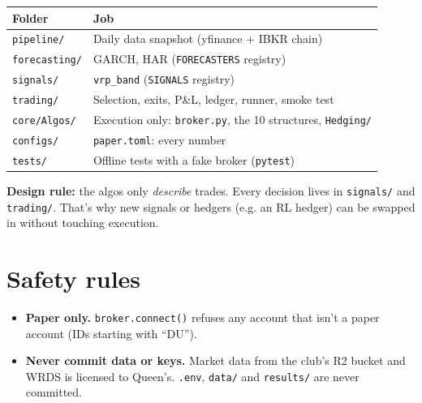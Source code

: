 \documentclass{article}
\begin{document}
\begin{center}\small
\begin{tabularx}{\linewidth}{>{\raggedright\arraybackslash}X >{\raggedright\arraybackslash}X}
\toprule
\textbf{Folder} & \textbf{Job} \\
\midrule
\texttt{pipeline/\allowbreak{}} & Daily data snapshot (yfinance + IBKR chain) \\
\texttt{forecasting/\allowbreak{}} & GARCH, HAR (\texttt{FORECASTERS} registry) \\
\texttt{signals/\allowbreak{}} & \texttt{vrp\_\allowbreak{}band} (\texttt{SIGNALS} registry) \\
\texttt{trading/\allowbreak{}} & Selection, exits, P\&L, ledger, runner, smoke test \\
\texttt{core/\allowbreak{}Algos/\allowbreak{}} & Execution only: \texttt{broker.\allowbreak{}py}, the 10 structures, \texttt{Hedging/\allowbreak{}} \\
\texttt{configs/\allowbreak{}} & \texttt{paper.\allowbreak{}toml}: every number \\
\texttt{tests/\allowbreak{}} & Offline tests with a fake broker (\texttt{pytest}) \\
\bottomrule
\end{tabularx}
\end{center}

\textbf{Design rule:} the algos only \emph{describe} trades. Every decision lives in \texttt{signals/\allowbreak{}} and \texttt{trading/\allowbreak{}}. That's why new signals or hedgers (e.g. an RL hedger) can be swapped in without touching execution.

\section{Safety rules}

\begin{itemize}

\item \textbf{Paper only.} \texttt{broker.\allowbreak{}connect()} refuses any account that isn't a paper account (IDs starting with ``DU'').

\item \textbf{Never commit data or keys.} Market data from the club's R2 bucket and WRDS is licensed to Queen's. \texttt{.\allowbreak{}env}, \texttt{data/\allowbreak{}} and \texttt{results/\allowbreak{}} are never committed.

\end{itemize}
\end{document}
